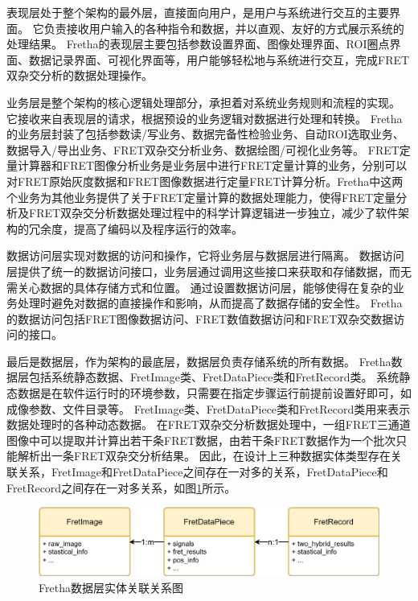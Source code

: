 表现层处于整个架构的最外层，直接面向用户，是用户与系统进行交互的主要界面。
它负责接收用户输入的各种指令和数据，并以直观、友好的方式展示系统的处理结果。
Fretha的表现层主要包括参数设置界面、图像处理界面、ROI圈点界面、数据记录界面、可视化界面等，用户能够轻松地与系统进行交互，完成FRET双杂交分析的数据处理操作。

业务层是整个架构的核心逻辑处理部分，承担着对系统业务规则和流程的实现。
它接收来自表现层的请求，根据预设的业务逻辑对数据进行处理和转换。
Fretha的业务层封装了包括参数读/写业务、数据完备性检验业务、自动ROI选取业务、数据导入/导出业务、FRET双杂交分析业务、数据绘图/可视化业务等。
FRET定量计算器和FRET图像分析业务是业务层中进行FRET定量计算的业务，分别可以对FRET原始灰度数据和FRET图像数据进行定量FRET计算分析。Fretha中这两个业务为其他业务提供了关于FRET定量计算的数据处理能力，使得FRET定量分析及FRET双杂交分析数据处理过程中的科学计算逻辑进一步独立，减少了软件架构的冗余度，提高了编码以及程序运行的效率。

数据访问层实现对数据的访问和操作，它将业务层与数据层进行隔离。
数据访问层提供了统一的数据访问接口，业务层通过调用这些接口来获取和存储数据，而无需关心数据的具体存储方式和位置。
通过设置数据访问层，能够使得在复杂的业务处理时避免对数据的直接操作和影响，从而提高了数据存储的安全性。
Fretha的数据访问包括FRET图像数据访问、FRET数值数据访问和FRET双杂交数据访问的接口。

最后是数据层，作为架构的最底层，数据层负责存储系统的所有数据。
Fretha数据层包括系统静态数据、FretImage类、FretDataPiece类和FretRecord类。
系统静态数据是在软件运行时的环境参数，只需要在指定步骤运行前提前设置好即可，如成像参数、文件目录等。
FretImage类、FretDataPiece类和FretRecord类用来表示数据处理时的各种动态数据。
在FRET双杂交分析数据处理中，一组FRET三通道图像中可以提取并计算出若干条FRET数据，由若干条FRET数据作为一个批次只能解析出一条FRET双杂交分析结果。
因此，在设计上三种数据实体类型存在关联关系，FretImage和FretDataPiece之间存在一对多的关系，FretDataPiece和FretRecord之间存在一对多关系，如图\ref{fig:fretha_data_relations}所示。

\begin{figure}[hbtp]
    \centering
    \includegraphics[width=1\linewidth]{../figures/2/2_Fretha数据层对应关系.png}
    \caption{Fretha数据层实体关联关系图}
    \label{fig:fretha_data_relations}
\end{figure}

